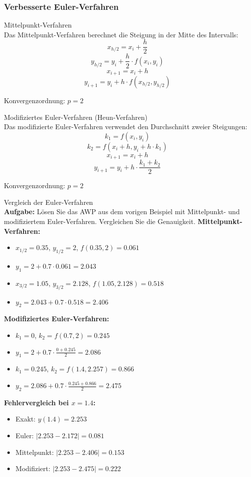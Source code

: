 \subsubsection{Verbesserte Euler-Verfahren}

\begin{theorem}{Mittelpunkt-Verfahren}\\
Das Mittelpunkt-Verfahren berechnet die Steigung in der Mitte des Intervalls:
$$x_{h/2} = x_i + \frac{h}{2}$$
$$y_{h/2} = y_i + \frac{h}{2} \cdot f(x_i, y_i)$$
$$x_{i+1} = x_i + h$$
$$y_{i+1} = y_i + h \cdot f(x_{h/2}, y_{h/2})$$

Konvergenzordnung: $p = 2$
\end{theorem}

\begin{corollary}{Modifiziertes Euler-Verfahren (Heun-Verfahren)}\\
Das modifizierte Euler-Verfahren verwendet den Durchschnitt zweier Steigungen:
$$k_1 = f(x_i, y_i)$$
$$k_2 = f(x_i + h, y_i + h \cdot k_1)$$
$$x_{i+1} = x_i + h$$
$$y_{i+1} = y_i + h \cdot \frac{k_1 + k_2}{2}$$

Konvergenzordnung: $p = 2$
\end{corollary}

\begin{example2}{Vergleich der Euler-Verfahren}\\
\textbf{Aufgabe:} Lösen Sie das AWP aus dem vorigen Beispiel mit Mittelpunkt- und modifiziertem Euler-Verfahren. Vergleichen Sie die Genauigkeit.
\tcblower
\textbf{Mittelpunkt-Verfahren:}
\begin{itemize}
    \item $x_{1/2} = 0.35$, $y_{1/2} = 2$, $f(0.35, 2) = 0.061$
    \item $y_1 = 2 + 0.7 \cdot 0.061 = 2.043$
    \item $x_{3/2} = 1.05$, $y_{3/2} = 2.128$, $f(1.05, 2.128) = 0.518$
    \item $y_2 = 2.043 + 0.7 \cdot 0.518 = 2.406$
\end{itemize}
\vspace{2mm}
\textbf{Modifiziertes Euler-Verfahren:}
\begin{itemize}
    \item $k_1 = 0$, $k_2 = f(0.7, 2) = 0.245$
    \item $y_1 = 2 + 0.7 \cdot \frac{0 + 0.245}{2} = 2.086$
    \item $k_1 = 0.245$, $k_2 = f(1.4, 2.257) = 0.866$
    \item $y_2 = 2.086 + 0.7 \cdot \frac{0.245 + 0.866}{2} = 2.475$
\end{itemize}
\vspace{2mm}
\textbf{Fehlervergleich bei $x = 1.4$:}
\begin{itemize}
    \item Exakt: $y(1.4) = 2.253$
    \item Euler: $|2.253 - 2.172| = 0.081$
    \item Mittelpunkt: $|2.253 - 2.406| = 0.153$
    \item Modifiziert: $|2.253 - 2.475| = 0.222$
\end{itemize}
\end{example2}

